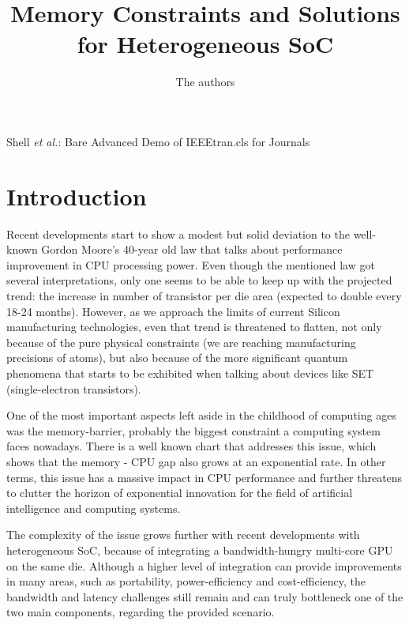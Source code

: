 \documentclass[12pt,journal,compsoc]{IEEEtran}
\begin{document}
%
\title{Memory Constraints and Solutions \\ for Heterogeneous SoC}

\author{The authors}

\markboth{}%
{Shell \MakeLowercase{\textit{et al.}}: Bare Advanced Demo of IEEEtran.cls for Journals}

\maketitle

\IEEEdisplaynontitleabstractindextext

\IEEEpeerreviewmaketitle

\section{Introduction}

\indent Recent developments start to show a modest but solid deviation to the well-known Gordon Moore's 40-year old law that talks about performance improvement in CPU processing power. Even though the mentioned law got several interpretations, only one seems to be able to keep up with the projected trend: the increase in number of transistor per die area (expected to double every 18-24 months). However, as we approach the limits of current Silicon manufacturing technologies, even that trend is threatened to flatten, not only because of the pure physical constraints (we are reaching manufacturing precisions of atoms), but also because of the more significant quantum phenomena that starts to be exhibited when talking about devices like SET (single-electron transistors).

One of the most important aspects left aside in the childhood of computing ages was the memory-barrier, probably the biggest constraint a computing system faces nowadays. There is a well known chart that addresses this issue, which shows that the memory - CPU gap also grows at an exponential rate. In other terms, this issue has a massive impact in CPU performance and further threatens to clutter the horizon of exponential innovation for the field of artificial intelligence and computing systems.

The complexity of the issue grows further with recent developments with heterogeneous SoC, because of integrating a bandwidth-hungry multi-core GPU on the same die. Although a higher level of integration can provide improvements in many areas, such as portability, power-efficiency and cost-efficiency, the bandwidth and latency challenges still remain and can truly bottleneck one of the two main components, regarding the provided scenario.
\end{document}
